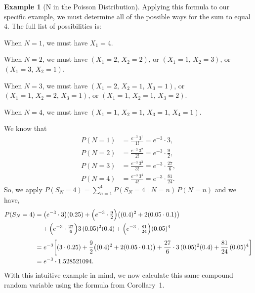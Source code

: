 \documentclass[11pt]{amsart}
\theoremstyle{definition}
\newtheorem{example}{Example}
\theoremstyle{plain}
\begin{document}
\begin{example}[N in the Poisson Distribution]
Applying this formula to our specific example, we must determine all of the
possible ways for the sum to equal $4$.  The full list of possibilities is:

\medskip
When $N = 1$, we must have $X_1 = 4$.

When $N = 2$, we must have $(X_1 = 2,\,X_2 = 2)$, or $(X_1 = 1,\,X_2 = 3)$,
or $(X_1 = 3,\,X_2 = 1)$.

When $N = 3$, we must have $(X_1 = 2,\,X_2 = 1,\,X_3 = 1)$,
or $(X_1 = 1,\,X_2 = 2,\,X_3 = 1)$, or $(X_1 = 1,\,X_2 = 1,\,X_3 = 2)$.

When $N = 4$, we must have $(X_1 = 1,\,X_2 = 1,\,X_3 = 1,\,X_4 = 1)$.

\medskip\noindent
We know that
\begin{align*}
    P(N = 1) &= \frac{e^{-3}\,3^{1}}{1!} = e^{-3}\cdot 3, \\
    P(N = 2) &= \frac{e^{-3}\,3^{2}}{2!} = e^{-3}\cdot\frac{9}{2}, \\
    P(N = 3) &= \frac{e^{-3}\,3^{3}}{3!} = e^{-3}\cdot\frac{27}{6}, \\
    P(N = 4) &= \frac{e^{-3}\,3^{4}}{4!} = e^{-3}\cdot\frac{81}{24}.
\end{align*}
So, we apply $P(S_N = 4) = \sum_{n=1}^{4} P(S_N = 4 \mid N = n)\,P(N = n)$
and we have,
\begin{align*}
P(S_N = 4)
    &= \bigl(e^{-3}\cdot 3\bigr)(0.25)
     + \Bigl(e^{-3}\cdot\tfrac{9}{2}\Bigr)
       \bigl((0.4)^{2} + 2(0.05\cdot 0.1)\bigr) \\
    &\quad
     + \Bigl(e^{-3}\cdot\tfrac{27}{6}\Bigr)3\,(0.05)^{2}(0.4)
     + \Bigl(e^{-3}\cdot\tfrac{81}{24}\Bigr)(0.05)^{4} \\[4pt]
    &= e^{-3}\!\left[
         (3\cdot 0.25)
         + \frac{9}{2}\bigl((0.4)^{2} + 2(0.05\cdot 0.1)\bigr)
         + \frac{27}{6}\cdot 3\,(0.05)^{2}(0.4)
         + \frac{81}{24}\,(0.05)^{4}
       \right] \\
    &= e^{-3} \cdot 1.528521094.
\end{align*}
With this intuitive example in mind, we now calculate this same compound random
variable using the formula from Corollary~1.


\end{example}
\end{document}
